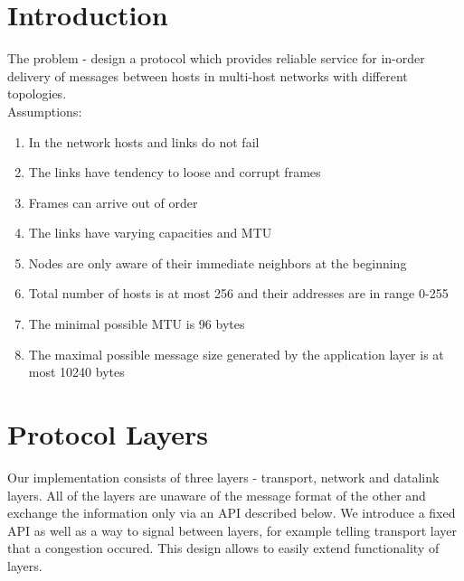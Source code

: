 \documentclass[11pt,a4paper,oneside]{report}
\begin{document}
\lstset{language=C}
\setcounter{secnumdepth}{1}


\title{}
\author{Group 7: \\ Igor Stassiy, Kirill Afanasev,Sanjar Karaev}
\date{\today}
\maketitle

\section*{Introduction}

  The problem - design a protocol which provides reliable service for
  in-order delivery of messages between hosts in multi-host networks with
  different topologies.  \\

  Assumptions:
  \begin{enumerate}
    \item In the network hosts and links do not fail
    \item The links have tendency to loose and corrupt frames
    \item Frames can arrive out of order
    \item The links have varying capacities and MTU
    \item Nodes are only aware of their immediate neighbors at the beginning
    \item Total number of hosts is at most 256 and their addresses are in range
    0-255
    \item The minimal possible MTU is 96 bytes
    \item The maximal possible message size generated by the application layer
    is at most 10240 bytes
  \end{enumerate}

\section*{Protocol Layers}
Our implementation consists of three layers - transport, network
and datalink layers. All of the layers are unaware of the message format of
the other and exchange the information only via an API described below. We
introduce a fixed API as well as a way to signal between layers, for example
telling transport layer that a congestion occured. This design allows to
easily extend functionality of layers.\\
\end{document}
